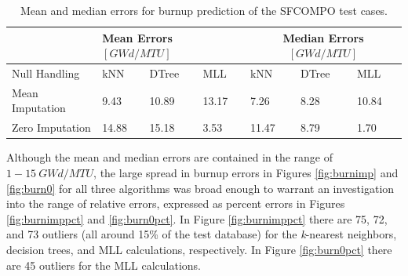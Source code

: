 \begin{table}[!htb]
  \centering
  \begin{tabular}{@{}m{1.5in}llllll@{}}
    \toprule
                     & \multicolumn{3}{m{2in}}{Mean Errors $[GWd/MTU]$} 
                     & \multicolumn{3}{c}{Median Errors $[GWd/MTU]$} 
                     \\ \toprule
    Null Handling    & kNN   & DTree & MLL   & kNN   & DTree & MLL    \\ \midrule
    Mean Imputation  & 9.43  & 10.89 & 13.17 & 7.26  & 8.28  & 10.84  \\
    Zero Imputation  & 14.88 & 15.18 & 3.53  & 11.47 & 8.79  & 1.70   \\ \bottomrule
  \end{tabular}
  \caption[Performance of burnup regression of \acrshort{SFCOMPO} entries]
          {Mean and median errors for burnup prediction of the 
          \acrshort{SFCOMPO} test cases.}
  \label{tbl:sfcoburn}
\end{table}

Although the mean and median errors are contained in the range of 
$1-15\:GWd/MTU$, the large spread in burnup errors in Figures \ref{fig:burnimp}
and \ref{fig:burn0} for all three algorithms was broad enough to warrant an
investigation into the range of relative errors, expressed as percent errors in
Figures \ref{fig:burnimppct} and \ref{fig:burn0pct}.  In Figure
\ref{fig:burnimppct} there are 75, 72, and 73 outliers (all around 15\% of the
test database) for the \textit{k}-nearest neighbors, decision trees, and
\gls{MLL} calculations, respectively.  In Figure \ref{fig:burn0pct} there are
45 outliers for the \gls{MLL} calculations.

